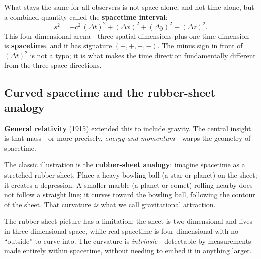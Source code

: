 \documentclass[11pt,a4paper]{article}
\newcommand{\term}[1]{\textbf{#1}}
\begin{document}
What stays the same for all observers is not space alone, and not time alone, but
a combined quantity called the \term{spacetime interval}:
\[
  s^2 = -c^2\,(\Delta t)^2 + (\Delta x)^2 + (\Delta y)^2 + (\Delta z)^2.
\]
This four-dimensional arena---three spatial dimensions plus one time dimension---is
\term{spacetime}, and it has signature $(+,+,+,-)$.  The minus sign in front of
$(\Delta t)^2$ is not a typo; it is what makes the time direction fundamentally
different from the three space directions.

\subsection{Curved spacetime and the rubber-sheet analogy}

\term{General relativity} (1915) extended this to include gravity.  The central
insight is that mass---or more precisely, \emph{energy and momentum}---warps the
geometry of spacetime.

The classic illustration is the \term{rubber-sheet analogy}: imagine spacetime as
a stretched rubber sheet.  Place a heavy bowling ball (a star or planet) on the
sheet; it creates a depression.  A smaller marble (a planet or comet) rolling nearby
does not follow a straight line; it curves toward the bowling ball, following the
contour of the sheet.  That curvature \emph{is} what we call gravitational attraction.

\medskip
\begin{center}
\end{center}

\medskip
The rubber-sheet picture has a limitation: the sheet is two-dimensional and lives
in three-dimensional space, while real spacetime is four-dimensional with no
``outside'' to curve into.  The curvature is \emph{intrinsic}---detectable by
measurements made entirely within spacetime, without needing to embed it in anything
larger.
\end{document}
